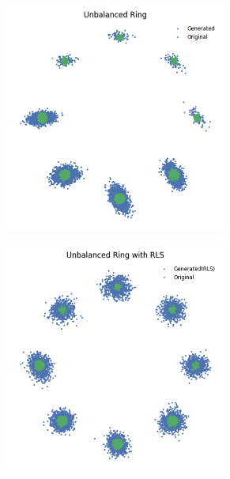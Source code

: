 \begin{figure}[ht]
    \centering
    \begin{subfigure}{0.45\textwidth}
        \centering
        \includegraphics[width=0.8\textwidth]{Figures/Methods/2dring_rkm.png}
    \end{subfigure}
    \hfill
    \begin{subfigure}{0.45\textwidth}
        \centering
        \includegraphics[width=0.8\textwidth]{Figures/Methods/2dring_rls.png}
    \end{subfigure}

\end{figure}
